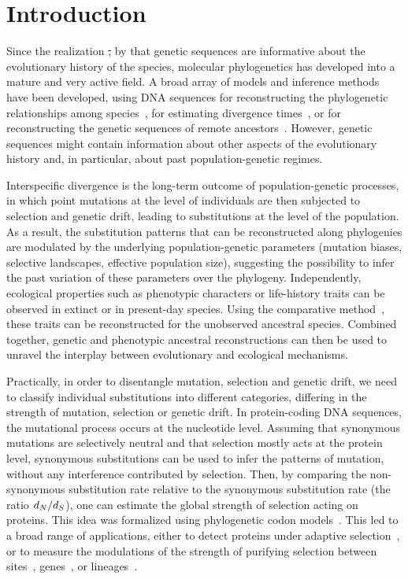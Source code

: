 \documentclass{article}
\providecommand{\DIFdeltex}[1]{{\protect\color{red}\sout{#1}}}                      %
\providecommand{\DIFdelbegin}{} %
\providecommand{\DIFdelend}{} %
\providecommand{\DIFdel}[1]{\texorpdfstring{\DIFdeltex{#1}}{}} %
\begin{document}
    \section{Introduction}
    \label{sec:Introduction}

    Since the realization \DIFdelbegin \DIFdel{, }\DIFdelend by \citet{Zuckerkandl1965} that genetic sequences are informative about the evolutionary history of the species, molecular phylogenetics has developed into a mature and very active field.
    A broad array of models and inference methods have been developed, using {DNA} sequences for reconstructing the phylogenetic relationships among species~\citep{Felsenstein1981}, for estimating divergence times~\citep{Thorne2002}, or for reconstructing the genetic sequences of remote ancestors~\citep{Liberles2007}.
    However, genetic sequences might contain information about other aspects of the evolutionary history and, in particular, about past population-genetic regimes.

    Interspecific divergence is the long-term outcome of population-genetic processes, in which point mutations at the level of individuals are then subjected to selection and {genetic drift}, leading to substitutions at the level of the population.
    As a result, the {substitution} patterns that can be reconstructed along phylogenies are modulated by the underlying population-genetic parameters (mutation biases, selective landscapes, effective population size), suggesting the possibility to infer the past variation of these parameters over the phylogeny.
    Independently, ecological properties such as phenotypic characters or life-history traits can be observed in extinct or in present-day species.
    Using the comparative method~\citep{Felsenstein1985}, these traits can be reconstructed for the unobserved ancestral species.
    Combined together, genetic and phenotypic ancestral reconstructions can then be used to unravel the interplay between evolutionary and ecological mechanisms.

    Practically, in order to disentangle mutation, selection and {genetic drift}, we need to classify individual substitutions into different categories, differing in the strength of mutation, selection or {genetic drift}.
    In protein-coding {DNA} sequences, the mutational process occurs at the nucleotide level.
    Assuming that {synonymous} mutations are selectively {neutral} and that selection mostly acts at the protein level, {synonymous} substitutions can be used to infer the patterns of mutation, without any interference contributed by selection.
    Then, by comparing the {non-synonymous} {substitution} rate relative to the {synonymous} {substitution} rate (the ratio $d_N / d_S$), one can estimate the global strength of selection acting on proteins.
    This idea was formalized using phylogenetic {codon} models~\citep{Muse1994,Goldman1994}.
    This led to a broad range of applications, either to detect proteins under adaptive selection~\citep{Kosiol2008}, or to measure the modulations of the strength of purifying selection between sites~\citep{Echave2016}, genes~\citep{Zhang2015}, or lineages~\citep{Lartillot2011}.
\end{document}
